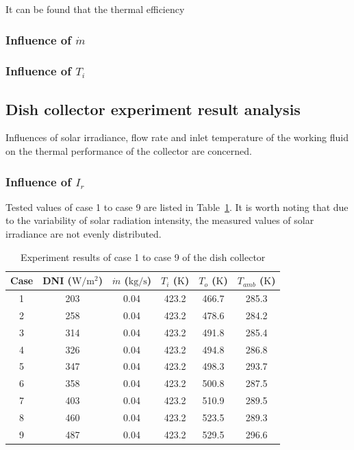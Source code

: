 It can be found that the thermal efficiency 

\subsubsection{Influence of $\dot{m}$}
\subsubsection{Influence of $T_i$}

\subsection{Dish collector experiment result analysis}
Influences of solar irradiance, flow rate and inlet temperature of the working fluid on the thermal performance of the collector are concerned.
\subsubsection{Influence of $I_r$}
Tested values of case 1 to case 9 are listed in Table~\ref{tab:ResultOfDish1}. It is worth noting that due to the variability of solar radiation intensity, the measured values of solar irradiance are not evenly distributed.

\begin{table}[htbp]\footnotesize
	\caption{Experiment results of case 1 to case 9 of the dish collector}
	\begin{center}
	\begin{tabular}{cccccc}
		\toprule
		Case	& DNI ($\mathrm{W/m^2}$)	&	$\dot{m}$ ($\mathrm{kg/s}$)			&	$T_i$ ($\mathrm{K}$)	&	$T_o$ ($\mathrm{K}$)		&	$T_{amb}$ ($\mathrm{K}$)\\
		\midrule
		1	&	203	&	0.04	&	423.2	&	466.7	&	285.3\\
		2	&	258	&	0.04	&	423.2	&	478.6	&	284.2\\
		3	&	314	&	0.04	&	423.2	&	491.8	&	285.4	\\
		4	&	326	&	0.04	&	423.2	&	494.8	&	286.8\\
		5	&	347	&	0.04	&	423.2	&	498.3	&	293.7\\
		6	&	358	&	0.04	&	423.2	&	500.8	&	287.5\\
		7	&	403	&	0.04	&	423.2	&	510.9	&	289.5\\
		8	&	460	&	0.04	&	423.2	&	523.5	&	289.3\\
		9	&	487	&	0.04	&	423.2	&	529.5	&	296.6\\
		\bottomrule
	\end{tabular}
	\end{center}
	\label{tab:ResultOfDish1}
\end{table}

